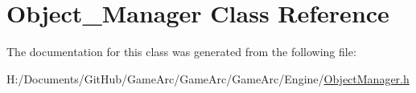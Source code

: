 \hypertarget{class_object___manager}{\section{Object\+\_\+\+Manager Class Reference}
\label{class_object___manager}
}


The documentation for this class was generated from the following file\+:\begin{DoxyCompactItemize}
\item 
H\+:/\+Documents/\+Git\+Hub/\+Game\+Arc/\+Game\+Arc/\+Game\+Arc/\+Engine/\hyperlink{_object_manager_8h}{Object\+Manager.\+h}\end{DoxyCompactItemize}
